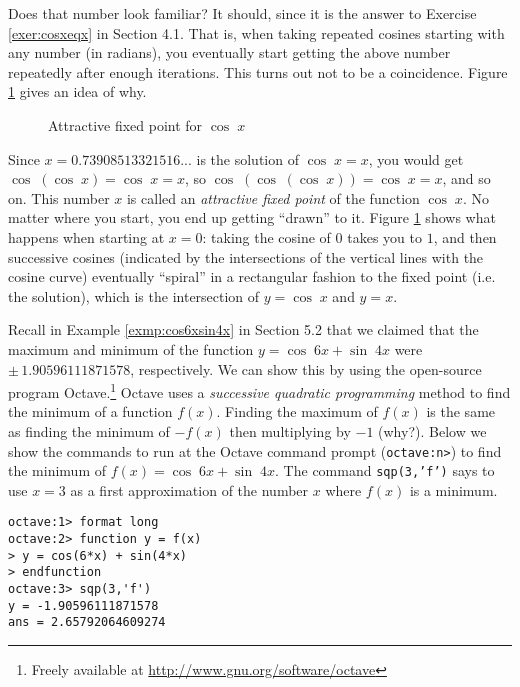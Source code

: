 Does that number look familiar? It should, since it is the answer to Exercise \ref{exer:cosxeqx} in
Section 4.1. That is, when taking repeated cosines starting with any number (in radians), you
eventually start getting the above number repeatedly after enough iterations. This turns out not to
be a coincidence. Figure \ref{fig:cosinefixed} gives an idea of why.

\begin{figure}[h]
 \begin{center}
  \vspace{-6mm}
 \end{center}
 \caption[]{\quad Attractive fixed point for $\cos\;x$}
 \label{fig:cosinefixed}
\end{figure}
Since $x=0.73908513321516...$ is the solution of $\cos\;x = x$, you would get
$\cos\;(\cos\;x) = \cos\;x = x$, so $\cos\;(\cos\;(\cos\;x)) = \cos\;x = x$, and so on. This number
$x$ is called an \emph{attractive fixed point} of the function $\cos\;x$. No matter where you
start, you end up getting ``drawn'' to it. Figure \ref{fig:cosinefixed} shows what happens when
starting at $x=0$: taking the cosine of $0$ takes you to $1$, and then successive cosines (indicated
by the intersections of the vertical lines with the cosine curve) eventually ``spiral'' in a
rectangular fashion to the fixed point (i.e. the solution), which is the intersection of $y=\cos\;x$
and $y=x$.

Recall in Example \ref{exmp:cos6xsin4x} in Section 5.2 that we claimed that the maximum and minimum
of the function $y=\cos\;6x + \sin\;4x$ were $\pm\,1.90596111871578$, respectively. We can show this
by using the open-source program Octave.\footnote{Freely available at
\url{http://www.gnu.org/software/octave}} Octave uses a \emph{successive quadratic
 programming} method to find the minimum of a function $f(x)$. Finding the maximum of $f(x)$ is the
same as finding the minimum of $-f(x)$ then multiplying by $-1$ (why?). Below we show the commands
to run at the Octave command prompt (\texttt{octave:n>}) to find the minimum of $f(x) =
\cos\;6x + \sin\;4x$. The command \texttt{sqp(3,'f')} says to use $x=3$ as a first approximation
of the number $x$ where $f(x)$ is a minimum.
 
\begin{Verbatim}[frame=single,framesep=2mm]
octave:1> format long
octave:2> function y = f(x)
> y = cos(6*x) + sin(4*x)
> endfunction
octave:3> sqp(3,'f')
y = -1.90596111871578
ans = 2.65792064609274
\end{Verbatim}

